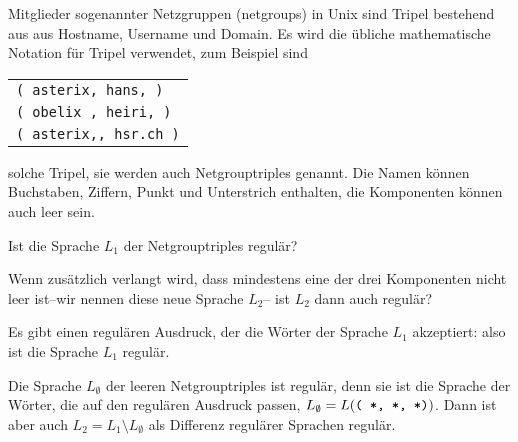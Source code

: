 Mitglieder sogenannter Netzgruppen (netgroups) in Unix sind Tripel
bestehend aus aus Hostname, Username und Domain. Es wird die übliche
mathematische Notation für Tripel verwendet, zum Beispiel sind
\begin{center}
\begin{tabular}{l}
{\tt ( asterix, hans, )}\\
{\tt ( obelix , heiri, )}\\
{\tt ( asterix,, hsr.ch )}
\end{tabular}
\end{center}
solche Tripel, sie werden auch Netgrouptriples genannt.
Die Namen können Buchstaben, Ziffern, Punkt und Unterstrich
enthalten, die Komponenten können auch leer sein.
\begin{teilaufgaben}
\item
Ist die Sprache $L_1$ der Netgrouptriples regulär?
\item
Wenn zusätzlich verlangt wird, dass mindestens eine der drei
Komponenten nicht leer ist--wir nennen diese neue Sprache $L_2$-- ist $L_2$
dann auch regulär?
\end{teilaufgaben}

\begin{loesung}
\begin{teilaufgaben}
\item
Es gibt einen regulären Ausdruck, der die Wörter der Sprache $L_1$
akzeptiert:
also ist die Sprache $L_1$ regulär.
\item
Die Sprache $L_\emptyset$ der leeren Netgrouptriples ist regulär, denn sie ist die
Sprache der Wörter, die auf den regulären Ausdruck
passen, $L_\emptyset = L(\text{\tt ( *, *, *)})$. Dann ist
aber auch $L_2=L_1\setminus L_\emptyset$ als Differenz regulärer
Sprachen regulär.
\qedhere
\end{teilaufgaben}
\end{loesung}
